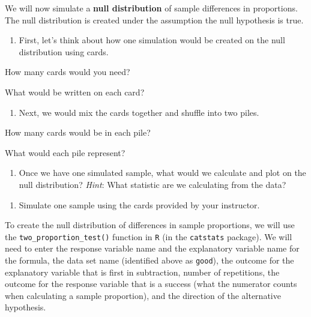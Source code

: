 \documentclass[
]{report}
\providecommand{\tightlist}{%
  \setlength{\itemsep}{0pt}\setlength{\parskip}{0pt}}
\newcommand{\rgi}{\hspace{24pt}}  %
\begin{document}
\newpage

We will now simulate a \textbf{null distribution} of sample differences in proportions. The null distribution is created under the assumption the null hypothesis is true.

\begin{enumerate}
\def\labelenumi{\arabic{enumi}.}
\setcounter{enumi}{11}
\tightlist
\item
  First, let's think about how one simulation would be created on the null distribution using cards.
\end{enumerate}

\rgi How many cards would you need?
\vspace{0.1in}

\rgi What would be written on each card?

\vspace{0.5in}

\begin{enumerate}
\def\labelenumi{\arabic{enumi}.}
\setcounter{enumi}{12}
\tightlist
\item
  Next, we would mix the cards together and shuffle into two piles.
\end{enumerate}

\rgi How many cards would be in each pile?\\
\vspace{0.1in}

\rgi What would each pile represent?
\vspace{0.5in}

\begin{enumerate}
\def\labelenumi{\arabic{enumi}.}
\setcounter{enumi}{13}
\tightlist
\item
  Once we have one simulated sample, what would we calculate and plot on the null distribution? \emph{Hint}: What statistic are we calculating from the data?
\end{enumerate}

\vspace{0.8in}

\begin{enumerate}
\def\labelenumi{\arabic{enumi}.}
\setcounter{enumi}{14}
\tightlist
\item
  Simulate one sample using the cards provided by your instructor.
\end{enumerate}

\vspace{1in}

To create the null distribution of differences in sample proportions, we will use the \texttt{two\_proportion\_test()} function in \texttt{R} (in the \texttt{catstats} package). We will need to enter the response variable name and the explanatory variable name for the formula, the data set name (identified above as \texttt{good}), the outcome for the explanatory variable that is first in subtraction, number of repetitions, the outcome for the response variable that is a success (what the numerator counts when calculating a sample proportion), and the direction of the alternative hypothesis.
\end{document}
